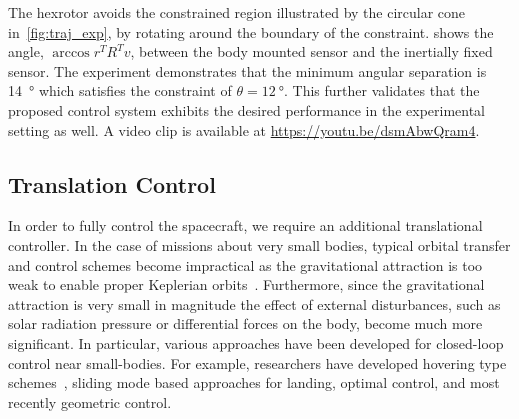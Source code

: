 The hexrotor avoids the constrained region illustrated by the circular cone in~\cref{fig:traj_exp}, by rotating around the boundary of the constraint. 
 shows the angle, \( \arccos r^T R^T v \), between the body mounted sensor and the inertially fixed sensor.
The experiment demonstrates that the minimum angular separation is \SI{14}{\degree} which satisfies the constraint of \( \theta = \SI{12}{\degree} \).
This further validates that the proposed control system exhibits the desired performance in the experimental setting as well. 
A video clip is available at \url{https://youtu.be/dsmAbwQram4}.

\subsection{Translation Control}
In order to fully control the spacecraft, we require an additional translational controller.
In the case of missions about very small bodies, typical orbital transfer and control schemes become impractical as the gravitational attraction is too weak to enable proper Keplerian orbits~\cite{broschart2005}.
Furthermore, since the gravitational attraction is very small in magnitude the effect of external disturbances, such as solar radiation pressure or differential forces on the body, become much more significant.
In particular, various approaches have been developed for closed-loop control near small-bodies.
For example, researchers have developed hovering type schemes~\cite{broschart2005,sawai2002}, sliding mode based approaches for landing, optimal control, and most recently geometric control.




